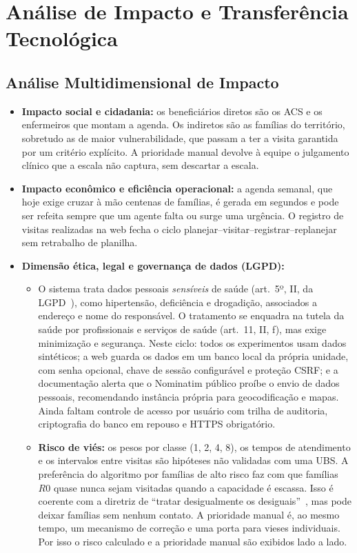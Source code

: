 \documentclass[11pt,a4paper]{article}
\begin{document}
\section{Análise de Impacto e Transferência Tecnológica}

\subsection{Análise Multidimensional de Impacto}
\begin{itemize}
    \item \textbf{Impacto social e cidadania:} os beneficiários diretos são os ACS e os enfermeiros que montam a agenda. Os indiretos são as famílias do território, sobretudo as de maior vulnerabilidade, que passam a ter a visita garantida por um critério explícito. A prioridade manual devolve à equipe o julgamento clínico que a escala não captura, sem descartar a escala.
    \item \textbf{Impacto econômico e eficiência operacional:} a agenda semanal, que hoje exige cruzar à mão centenas de famílias, é gerada em segundos e pode ser refeita sempre que um agente falta ou surge uma urgência. O registro de visitas realizadas na web fecha o ciclo planejar--visitar--registrar--replanejar sem retrabalho de planilha.
    \item \textbf{Dimensão ética, legal e governança de dados (LGPD):}
    \begin{itemize}
        \item O sistema trata dados pessoais \emph{sensíveis} de saúde (art.~5º, II, da LGPD~\cite{lgpd}), como hipertensão, deficiência e drogadição, associados a endereço e nome do responsável. O tratamento se enquadra na tutela da saúde por profissionais e serviços de saúde (art.~11, II, f), mas exige minimização e segurança. Neste ciclo: todos os experimentos usam dados sintéticos; a web guarda os dados em um banco local da própria unidade, com senha opcional, chave de sessão configurável e proteção CSRF; e a documentação alerta que o Nominatim público proíbe o envio de dados pessoais, recomendando instância própria para geocodificação e mapas. Ainda faltam controle de acesso por usuário com trilha de auditoria, criptografia do banco em repouso e HTTPS obrigatório.
        \item \textbf{Risco de viés:} os pesos por classe (1, 2, 4, 8), os tempos de atendimento e os intervalos entre visitas são hipóteses não validadas com uma UBS. A preferência do algoritmo por famílias de alto risco faz com que famílias $R0$ quase nunca sejam visitadas quando a capacidade é escassa. Isso é coerente com a diretriz de ``tratar desigualmente os desiguais''~\cite{coelho2004}, mas pode deixar famílias sem nenhum contato. A prioridade manual é, ao mesmo tempo, um mecanismo de correção e uma porta para vieses individuais. Por isso o risco calculado e a prioridade manual são exibidos lado a lado.

\end{itemize}
\end{itemize}
\end{document}

